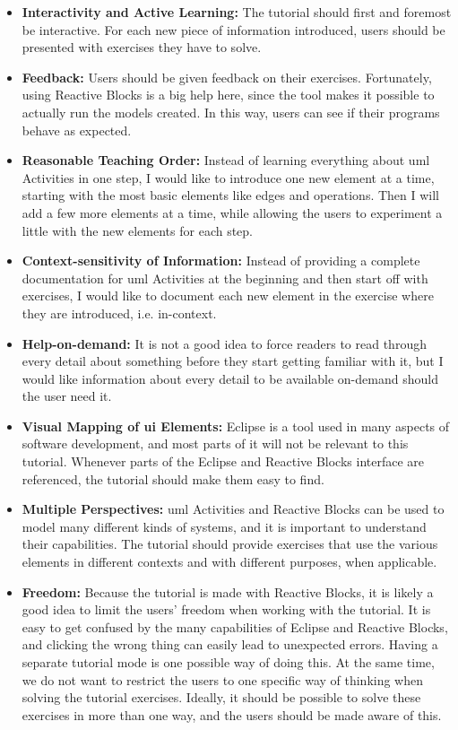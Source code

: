 \begin{itemize}
	\item{\textbf{Interactivity and Active Learning:}} The tutorial should first and foremost be interactive. For each new piece of information introduced, users should be presented with exercises they have to solve.
	\item{\textbf{Feedback:}} Users should be given feedback on their exercises. Fortunately, using Reactive Blocks is a big help here, since the tool makes it possible to actually run the models created. In this way, users can see if their programs behave as expected.
	\item{\textbf{Reasonable Teaching Order:}} Instead of learning everything about \gls{uml} Activities in one step, I would like to introduce one new element at a time, starting with the most basic elements like edges and operations. Then I will add a few more elements at a time, while allowing the users to experiment a little with the new elements for each step.
	\item{\textbf{Context-sensitivity of Information:}} Instead of providing a complete documentation for \gls{uml} Activities at the beginning and then start off with exercises, I would like to document each new element in the exercise where they are introduced, i.e. in-context.
	\item{\textbf{Help-on-demand:}} It is not a good idea to force readers to read through every detail about something before they start getting familiar with it, but I would like information about every detail to be available on-demand should the user need it.
	\item{\textbf{Visual Mapping of \gls{ui} Elements:}} Eclipse is a tool used in many aspects of software development, and most parts of it will not be relevant to this tutorial. Whenever parts of the Eclipse and Reactive Blocks interface are referenced, the tutorial should make them easy to find.
	\item{\textbf{Multiple Perspectives:}} \gls{uml} Activities and Reactive Blocks can be used to model many different kinds of systems, and it is important to understand their capabilities. The tutorial should provide exercises that use the various elements in different contexts and with different purposes, when applicable.
	\item{\textbf{Freedom:}} Because the tutorial is made with Reactive Blocks, it is likely a good idea to limit the users' freedom when working with the tutorial. It is easy to get confused by the many capabilities of Eclipse and Reactive Blocks, and clicking the wrong thing can easily lead to unexpected errors. Having a separate tutorial mode is one possible way of doing this. At the same time, we do not want to restrict the users to one specific way of thinking when solving the tutorial exercises. Ideally, it should be possible to solve these exercises in more than one way, and the users should be made aware of this.
\end{itemize}

